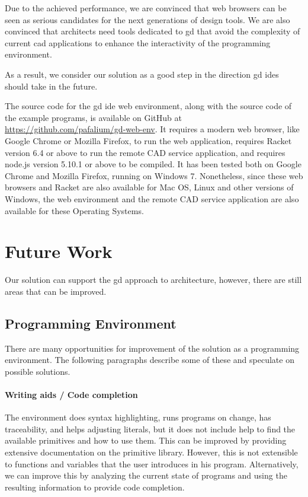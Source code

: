 Due to the achieved performance, we are convinced that web browsers can be seen as serious candidates for the next generations of design tools.
We are also convinced that architects need tools dedicated to \gls{gd} that avoid the complexity of current \gls{cad} applications to enhance the interactivity of the programming environment.

As a result, we consider our solution as a good step in the direction \gls{gd} \glspl{ide} should take in the future.

The source code for the \gls{gd} \gls{ide} web environment, along with the source code of the example programs, is available on GitHub at \url{https://github.com/pafalium/gd-web-env}.
It requires a modern web browser, like Google Chrome or Mozilla Firefox, to run the web application, requires Racket version 6.4 or above to run the remote CAD service application, and requires node.js version 5.10.1 or above to be compiled.
It has been tested both on Google Chrome and Mozilla Firefox, running on Windows 7.
Nonetheless, since these web browsers and Racket are also available for Mac OS, Linux and other versions of Windows, the web environment and the remote CAD service application are also available for these Operating Systems.


\section{Future Work}
Our solution can support the \gls{gd} approach to architecture, however, there are still areas that can be improved.


\subsection{Programming Environment}
There are many opportunities for improvement of the solution as a programming environment.
The following paragraphs describe some of these and speculate on possible solutions.

\paragraph{Writing aids / Code completion}
The environment does syntax highlighting, runs programs on change, has traceability, and helps adjusting literals, but it does not include help to find the available primitives and how to use them.
This can be improved by providing extensive documentation on the primitive library.
However, this is not extensible to functions and variables that the user introduces in his program.
Alternatively, we can improve this by analyzing the current state of programs and using the resulting information to provide code completion.


